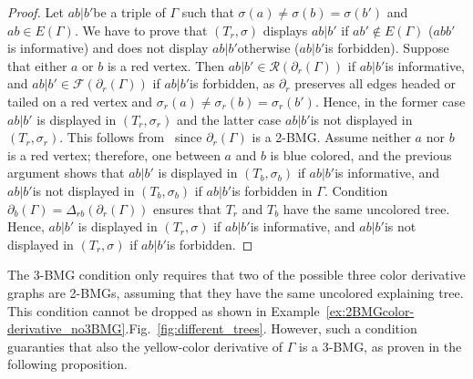\documentclass[final,3p,times]{elsarticle}
\newcommand{\OLD}[1]{\begingroup\tiny\color{gray}#1\endgroup}
\newcommand{\mh}[1]{\begingroup\color{magenta}#1\endgroup}
\begin{document}
\begin{proof}
Let $ab|b'$be a triple of $\Gamma$ such that $\sigma(a)\ne \sigma(b)=\sigma(b')$ and $ab\in E(\Gamma)$. We have to prove that $(T_r,\sigma)$ displays $ab|b'$ if $ab'\notin E(\Gamma)$ ($ abb'$ is informative) and does not display $ab|b'$otherwise ($ab|b'$is forbidden). Suppose that either $a$ or $b$ is a red vertex. Then $ab|b'\in \mathscr{R}(\partial_{r}(\Gamma))$ if $ab|b'$is informative, and $ab|b'\in \mathscr{F}(\partial_{r}(\Gamma))$ if $ab|b'$is forbidden, as $\partial_{r}$ preserves all edges headed or tailed on a red vertex and $\sigma_r(a)\ne \sigma_r(b)=\sigma_r(b')$. Hence, in the former case $ab|b'$ is displayed in $(T_r,\sigma_r)$ and the latter case $ab|b'$is not displayed in $(T_r,\sigma_r)$. This follows from~\cite[Proposition~2.3]{korchmaros2021quasi} since $\partial_{r}(\Gamma)$ is a 2-BMG. Assume neither $a$ nor $b$ is a red vertex; therefore, one between $a$ and $b$ is blue colored, and the previous argument shows that $ab|b'$ is displayed in $(T_b,\sigma_b)$ if $ab|b'$is informative, and $ab|b'$is not displayed in $(T_b,\sigma_b)$ if $ab|b'$is forbidden in $\Gamma$. Condition $\partial_b(\Gamma)=\Delta_{rb}(\partial_r(\Gamma))$ ensures that $T_r$ and $T_b$ have the same uncolored tree. Hence, $ab|b'$ is displayed in $(T_r,\sigma)$ if $ab|b'$is informative, and $ab|b'$is not displayed in $(T_r,\sigma)$ if $ab|b'$is forbidden.
\end{proof}

The 3-BMG condition only requires that two of the possible three color derivative graphs are 2-BMGs, assuming that they have the same uncolored explaining tree. This condition cannot be dropped as shown in \OLD{Example~\ref{ex:2BMGcolor-derivative_no3BMG}.}\mh{Fig.\ \ref{fig:different_trees}.}
 However, such a condition guaranties that also the yellow-color derivative of $\Gamma$ is a 3-BMG, as proven in the following proposition. 
\end{document}
